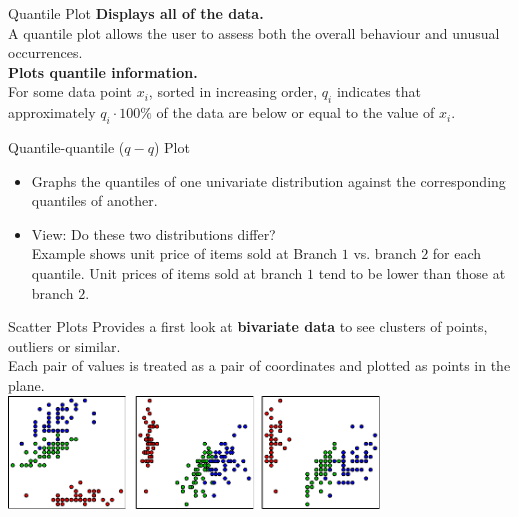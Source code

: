 \begin{frame}{Quantile Plot}
  \textbf{Displays all of the data.}\\
  A quantile plot allows the user to assess both the overall behaviour and unusual occurrences.\\[0.5cm]
  \textbf{Plots quantile information.}\\
  For some data point $x_i$, sorted in increasing order, $q_i$ indicates that approximately $q_i \cdot 100 \%$ of the data are below or equal to the value of $x_i$.\\[0.2cm]
  \centering
\end{frame}

\begin{frame}{Quantile-quantile ($q-q$) Plot}
  \begin{itemize}
  \item Graphs the quantiles of one univariate distribution against the corresponding quantiles of another.
  \item View: Do these two distributions differ?\\
    Example shows unit price of items sold at Branch $1$ vs. branch $2$ for each quantile.  Unit prices of items sold at branch $1$ tend to be lower than those at branch $2$.
  \end{itemize}\vspace{0.5cm}
  \centering
\end{frame}

\begin{frame}{Scatter Plots}
  Provides a first look at \textbf{bivariate data} to see clusters of points, outliers or similar.\\
  Each pair of values is treated as a pair of coordinates and plotted as points in the plane.\\[0.5cm]
  \centering
  \includegraphics[height=3cm]{img/scatterplot.pdf}
\end{frame}

